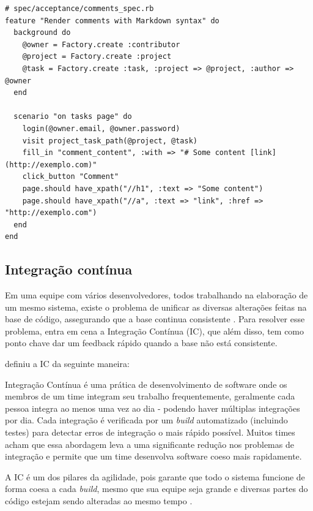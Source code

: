 \begin{lstlisting}[caption=Especificação ,label=code:bdd_spec_1]
# spec/acceptance/comments_spec.rb
feature "Render comments with Markdown syntax" do
  background do
    @owner = Factory.create :contributor
    @project = Factory.create :project
    @task = Factory.create :task, :project => @project, :author => @owner
  end

  scenario "on tasks page" do
    login(@owner.email, @owner.password)
    visit project_task_path(@project, @task)
    fill_in "comment_content", :with => "# Some content [link](http://exemplo.com)"
    click_button "Comment"
    page.should have_xpath("//h1", :text => "Some content")
    page.should have_xpath("//a", :text => "link", :href => "http://exemplo.com")
  end
end
\end{lstlisting}

\subsection{Integração contínua}

Em uma equipe com vários desenvolvedores, todos trabalhando na elaboração de um mesmo sistema, existe o problema de unificar as diversas alterações feitas na base de código, assegurando que a base continua consistente \cite{ImproveitCI}. Para resolver esse problema, entra em cena a Integração Contínua (IC), que além disso, tem como ponto chave dar um feedback rápido quando a base não está consistente.

\cite{FowlerCI} definiu a IC da seguinte maneira:

\begin{citacao}
Integração Contínua é uma prática de desenvolvimento de software onde os membros de um time integram seu trabalho frequentemente, geralmente cada pessoa integra ao menos uma vez ao dia - podendo haver múltiplas integrações por dia. Cada integração é verificada por um \textit{build} automatizado (incluindo testes) para detectar erros de integração o mais rápido possível. Muitos times acham que essa abordagem leva a uma significante redução nos problemas de integração e permite que um time desenvolva software coeso mais rapidamente.
\end{citacao}

A IC é um dos pilares da agilidade, pois garante que todo o sistema funcione de forma coesa a cada \textit{build}, mesmo que sua equipe seja grande e diversas partes do código estejam sendo alteradas ao mesmo tempo \cite{CaelumCI}.

